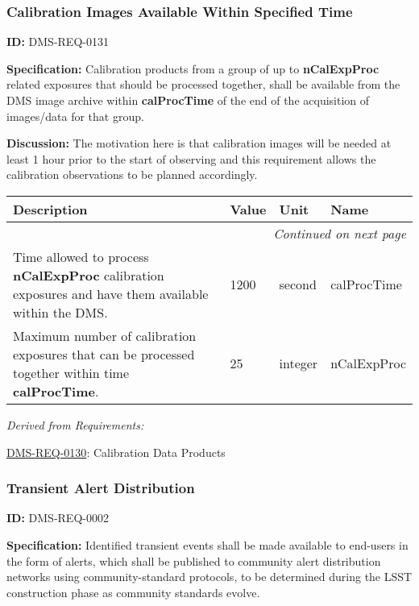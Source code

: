 \documentclass[SE,toc,lsstdraft]{lsstdoc}
\makeatletter
\newcommand{\paramname}[1]{\hspace{0pt}#1}
\newcommand{\unitname}[1]{\hspace{0pt}#1}
\newenvironment{parameters}[0]{%
\setlength\LTleft{0pt}
\setlength\LTright{\fill}
\begin{small}
\begin{longtable}[]{|p{0.5\textwidth}|l|p{0.6in}|p{1.74in}@{}|}

\hline \textbf{Description} & \textbf{Value} & \textbf{Unit} & \textbf{Name} \\ \hline
\endhead

\hline \multicolumn{4}{r}{\emph{Continued on next page}} \\
\endfoot

\hline\hline
\endlastfoot
}{%
\hline
\end{longtable}
\end{small}
}
\makeatother
\begin{document}
\subsubsection{Calibration Images Available Within Specified Time}

\label{DMS-REQ-0131}
\textbf{ID:} DMS-REQ-0131

    \textbf{Specification:} Calibration products from a group of up to \textbf{nCalExpProc} related exposures that should be processed together, shall be available from the DMS image archive within \textbf{calProcTime} of the end of the acquisition of images/data for that group.

\textbf{Discussion: }The motivation here is that calibration images will be needed at least 1 hour prior to the start of observing and this requirement allows the calibration observations to be planned accordingly.



\begin{parameters}
Time allowed to process \textbf{nCalExpProc} calibration exposures and have them available within the DMS.
&
1200
&
\unitname{%
second
}
&
\paramname{%
calProcTime
} \\\hline

Maximum number of calibration exposures that can be processed together within time \textbf{calProcTime}.



&
25
&
\unitname{%
integer
}
&
\paramname{%
nCalExpProc
} \\\hline
\end{parameters}




\emph{Derived from Requirements:}

\hyperref[DMS-REQ-0130]{DMS-REQ-0130}:
Calibration Data Products \newline


\subsubsection{Transient Alert Distribution}

\label{DMS-REQ-0002}
\textbf{ID:} DMS-REQ-0002

\textbf{Specification:} Identified transient events shall be made available to end-users in the form of alerts, which shall be published to community alert distribution networks using community-standard protocols, to be determined during the LSST construction phase as community standards evolve.
\end{document}

